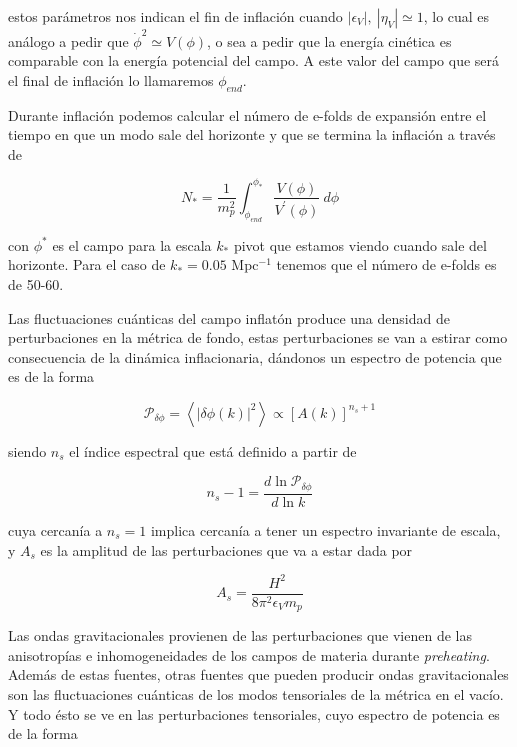 \noindent
estos parámetros nos indican el fin de inflación cuando $\left| \epsilon_V \right|, ~ \left| \eta_V \right| \simeq 1$, lo cual es análogo a pedir que $\dot{\phi}^2 \simeq V(\phi)$, o sea a pedir que la energía cinética es comparable con la energía potencial del campo. A este valor del campo que será el final de inflación lo llamaremos $\phi_{end}$.

Durante inflación podemos calcular el número de e-folds de expansión entre el tiempo en que un modo sale del horizonte y que se termina la inflación a través de

\begin{equation}
    N_* = \frac{1}{m_p^2} \int_{\phi_{end}}^{\phi_*} \frac{V (\phi)}{V^\prime (\phi)} ~ d\phi
\end{equation}

\noindent
con $\phi^*$ es el campo para la escala $k_*$ pivot que estamos viendo cuando sale del horizonte. Para el caso de $k_* = 0.05$ Mpc$^{-1}$ tenemos que el número de e-folds es de 50-60.

Las fluctuaciones cuánticas del campo inflatón produce una densidad de perturbaciones en la métrica de fondo, estas perturbaciones se van a estirar como consecuencia de la dinámica inflacionaria, dándonos un espectro de potencia que es de la forma 

\begin{equation}
    \mathcal{P}_{\delta \phi} = \left\langle \left| \delta \phi (k) \right|^2 \right\rangle \propto \left[ A (k) \right]^{n_s + 1}
\end{equation}

\noindent
siendo $n_s$ el índice espectral que está definido a partir de

\begin{equation}
    n_s - 1 = \frac{d \ln \mathcal{P}_{\delta \phi}}{d \ln k} 
\end{equation}

\noindent
cuya cercanía a $n_s = 1$ implica cercanía a tener un espectro invariante de escala, y $A_s$ es la amplitud de las perturbaciones que va a estar dada por 

\begin{equation}
    A_s = \frac{H^2}{8 \pi^2 \epsilon_V m_p}
\end{equation}

Las ondas gravitacionales provienen de las perturbaciones que vienen de las anisotropías e inhomogeneidades de los campos de materia durante \textit{preheating}. Además de estas fuentes, otras fuentes que pueden producir ondas gravitacionales son las fluctuaciones cuánticas de los modos tensoriales de la métrica en el vacío. Y todo ésto se ve en las perturbaciones tensoriales, cuyo espectro de potencia es de la forma

